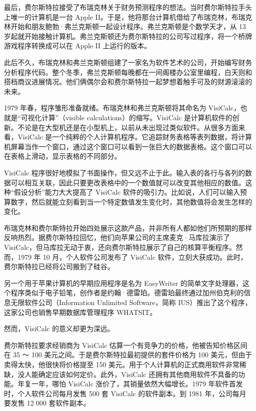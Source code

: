 \documentclass[12pt,UTF8]{ctexbook}
\begin{document}
最后，费尔斯特拉接受了布瑞克林关于财务预测程序的想法。当时费尔斯特拉手头上唯一的计算机是一台 Apple II。于是，他将那台计算机借给了布瑞克林，布瑞克林开始和朋友鲍勃·弗兰克斯顿一起设计程序。弗兰克斯顿是个数学天才，从 13 岁起就开始接触计算机。弗兰克斯顿还为费尔斯特拉的公司写过程序，将一个桥牌游戏程序转换成可以在 Apple II 上运行的版本。

此后不久，布瑞克林和弗兰克斯顿组建了一家名为软件艺术的公司，开始编写财务分析程序代码。整个冬季，弗兰克斯顿每晚都在一间阁楼办公室里编程，白天则和搭档商议进展情况。他们俩偶尔会和费尔斯特拉一起梦想着触手可及的财源滚滚的未来。

1979 年春，程序雏形准备就绪。布瑞克林和弗兰克斯顿将其命名为 VisiCalc，也就是“可视化计算”（visible calculations）的缩写。VisiCalc 是计算机软件的创新。不论是在大型机还是在小型机上，以前从未出现过类似软件。从很多方面来看，VisiCalc 是一个纯粹的个人计算机程序。它追踪财务表格等表列数据，将计算机屏幕当作一个窗口，通过这个窗口可以看到一张巨大的数据表格。这个窗口可以在表格上滑动，显示表格的不同部分。

VisiCalc 程序很好地模拟了书面操作，但又远不止于此。输入表的各行与各列的数据可以相互关联，因此只要更改表格中的一个数值就可以改变其他相应的数值。这种“假设分析”能力大大提高了 VisiCalc 软件的吸引力。比如说，人们可以输入预算数字，然后就能立刻看到当一个特定数值发生变化时，其他数值将会发生怎样的变化。

布瑞克林和费尔斯特拉开始四处展示这款产品，并非所有人都如他们所预期的那样反响热烈。据费尔斯特拉回忆，他们向苹果公司的主席麦克·马库拉演示了 VisiCalc，但马库拉无动于衷，还向费尔斯特拉展示了自己的核算平衡程序。然而，1979 年 10 月，个人软件公司发布了 VisiCalc 软件，立刻大获成功。此时，费尔斯特拉已经将公司搬到了硅谷。

另一个用于苹果计算机的早期应用程序是名为 EasyWriter 的简单文字处理器，这个程序类似于电子铅笔，创作者是约翰·德雷珀。德雷珀最终通过加州伯克利的信息无限软件公司（Information Unlimited Software，简称 IUS）推出了这个程序，这家公司也销售早期数据库管理程序 WHATSIT。

然而，VisiCalc 的意义却更为深远。

费尔斯特拉要求经销商为 VisiCalc 估算一个有竞争力的价格，他被告知价格区间在 35 ～ 100 美元之间。于是费尔斯特拉最初提供的套件价格为 100 美元，但由于卖得太快，他很快将价格提至 150 美元。用于个人计算机的正式商用软件非常稀缺，没人能确定应该如何定价。此外，VisiCalc 还拥有其他商用软件不具备的功能。年复一年，哪怕 VisiCalc 涨价了，其销量依然大幅增长。1979 年软件首发时，个人软件公司每月发售 500 套 VisiCalc 的软件副本。到 1981 年，公司每月要发售 12 000 套软件副本。
\end{document}
